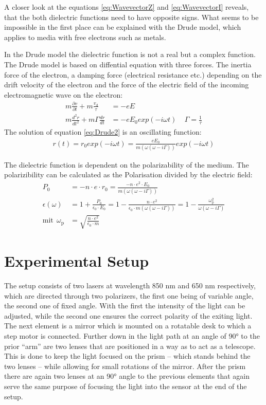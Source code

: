 \documentclass[twoside,english,headsepline=on,DIV=12]{scrartcl}
\numberwithin{equation}{section}
\begin{document}
A closer look at the equations \ref{eq:WavevectorZ} and \ref{eq:WavevectorI} reveals, that the both dielectric functions need to have opposite signs. What seems to be impossible in the first place can be explained with the Drude model, which applies to media with free electrons such as metals. 

In the Drude model the dielectric function is not a real but a complex function. The Drude model is based on diffential equation with three forces. The inertia force of the electron, a damping force (electrical resistance etc.) depending on the drift velocity of the electron and the force of the electric field of the incoming electromagnetic wave on the electron:
\begin{align}
m \frac{\partial v}{\partial t} + m \frac{v_\text{d}}{\tau} &= -e E \label{eq:Drude1} \\
m \frac{d^2 r}{dt^2} + m \Gamma \frac{dr}{dt} &= -e E_0 exp(-i \omega t) \label{eq:Drude2} \ \ \ \ \ \Gamma = \frac{1}{\tau}
\end{align}
The solution of equation \ref{eq:Drude2} is an oscillating function:
\begin{align}
r(t) = r_0 exp(-i \omega t) = \frac{e E_0}{m(\omega(\omega - i \Gamma))} exp(-i \omega t) \label{eq:DrudeSolution}
\end{align}

The dielectric function is dependent on the polarizability of the medium. The polarizibility can be calculated as the Polarisation divided by the electric field:
\begin{align}
P_0 &= -n \cdot e \cdot r_0 = \frac{-n \cdot e^2 \cdot E_0}{m(\omega(\omega - i \Gamma))} \label{eq:Polarisation} \\
\epsilon (\omega) &= 1 + \frac{P_0}{\epsilon_0 \cdot E_0} = 1 - \frac{n \cdot e^2}{\epsilon_0 \cdot m(\omega(\omega - i \Gamma))} = 1 - \frac{\omega_\text{p}^2}{\omega(\omega - i \Gamma)} \label{eq:DielectricFunction} \\
\text{mit} \ \ \omega_\text{p}& = \sqrt{\frac{n \cdot e^2}{\epsilon_0 \cdot m}} \label{eq:PlasmaFrequency}
\end{align}

\section{Experimental Setup}
The setup consists of two lasers at wavelength 850 nm and 650 nm respectively, which are directed through two polarizers, the first one being of variable angle, the second one of fixed angle. With the first the intensity of the light can be adjusted, while the second one ensures the correct polarity of the exiting light. The next element is a mirror which is mounted on a rotatable desk to which a step motor is connected. Further down in the light path at an angle of 90° to the prior ``arm'' are two lenses that are positioned in a way as to act as a telescope. This is done to keep the light focused on the prism -- which stands behind the two lenses -- while allowing for small rotations of the mirror. After the prism there are again two lenses at an 90° angle to the previous elements that again serve the same purpose of focusing the light into the sensor at the end of the setup.
\end{document}
